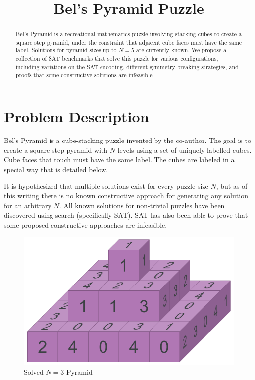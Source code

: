 \documentclass[conference]{IEEEtran}
\begin{document}
\title{Bel's Pyramid Puzzle}

\author{
\and
{}
}

\maketitle

\begin{abstract}
Bel's Pyramid is a recreational mathematics puzzle involving stacking cubes to create a square step pyramid,
under the constraint that adjacent cube faces must have the same label.
Solutions for pyramid sizes up to $N=5$ are currently known.
We propose a collection of SAT benchmarks that solve this puzzle for various configurations,
including variations on the SAT encoding, different symmetry-breaking strategies, and proofs
that some constructive solutions are infeasible.
\end{abstract}

\section{Problem Description}
Bel's Pyramid is a cube-stacking puzzle invented by the co-author.
The goal is to create a square step pyramid with $N$ levels using a set of uniquely-labelled cubes.
Cube faces that touch must have the same label.
The cubes are labeled in a special way that is detailed below.

It is hypothesized that multiple solutions exist for every puzzle size $N$, but as of this writing there is no known
constructive approach for generating any solution for an arbitrary $N$.
All known solutions for non-trivial puzzles have been discovered using search (specifically SAT).
SAT has also been able to prove that some proposed constructive approaches are infeasible.

\begin{figure}[htbp]
\centerline{\includegraphics[width=\linewidth]{example.png}}
\caption{Solved $N=3$ Pyramid}
\label{example}
\end{figure}
\end{document}
